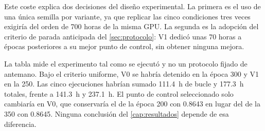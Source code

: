 Este coste explica dos decisiones del dise\~no experimental. La primera es el uso de una
\'unica semilla por variante, ya que replicar las cinco condiciones tres veces exigir\'ia
del orden de \num{700} horas de la misma GPU. La segunda es la adopci\'on del criterio de
parada anticipada del \cref{sec:protocolo}: V1 dedic\'o unas \num{70} horas a \'epocas
posteriores a su mejor punto de control, sin obtener ninguna mejora.

La tabla mide el experimento tal como se ejecut\'o y no un protocolo fijado de antemano.
Bajo el criterio uniforme, V0 se habr\'ia detenido en la \'epoca \num{300} y V1 en la
\num{250}. Las cinco ejecuciones habr\'ian sumado \SI{111.4}{\hour} de bucle y
\SI{177.3}{\hour} totales, frente a \SI{141.3}{\hour} y \SI{237.1}{\hour}. El punto de
control seleccionado solo cambiar\'ia en V0, que conservar\'ia el de la \'epoca \num{200}
con \num{0.8643} en lugar del de la \num{350} con \num{0.8645}. Ninguna conclusi\'on del
\cref{cap:resultados} depende de esa diferencia.
